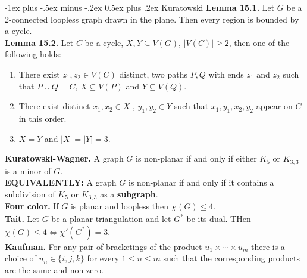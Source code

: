 \documentclass[10pt,landscape]{article}
\makeatletter
\renewcommand{\section}{\@startsection{section}{1}{0mm}%
                                {-1ex plus -.5ex minus -.2ex}%
                                {0.5ex plus .2ex}%
                                {\normalfont\large\bfseries}}
\makeatother
\begin{document}
\begin{multicols}{3}
\section{Kuratowski}
\textbf{Lemma 15.1.} Let \( G \) be a 2-connected loopless graph drawn in the plane. Then every region is bounded by a cycle. \\
\textbf{Lemma 15.2.} Let \( C \) be a cycle, \( X,Y \subseteq V(G) \), \( |V(C)| \geq 2 \), then one of the following holds:
\begin{enumerate}
	\item There exist \( z_1, z_2 \in V(C) \) distinct, two paths \( P,Q \) with ends \( z_1 \) and \( z_2 \) such that \( P \cup Q = C\), \( X \subseteq V(P) \) and \( Y \subseteq V(Q) \).
	\item There exist distinct \( x_1, x_2 \in X \) , \( y_1, y_2 \in Y \) such that \( x_1, y_1, x_2, y_2 \) appear on \( C \) in this order. 
	\item \( X = Y \) and \( |X|=|Y|=3 \).
	
	
	
\end{enumerate}
\textbf{Kuratowski-Wagner.} A graph \( G \) is non-planar if and only if either \( K_5 \) or \( K_{3,3}   \) is a minor of \( G \). \\
\textbf{EQUIVALENTLY:} A graph \( G \) is non-planar if and only if it contains a subdivision of \( K_5 \) or \( K_{3,3}  \) as a \textbf{subgraph}. \\
\textbf{Four color.} If \( G \) is planar and loopless then \( \chi_{} (G) \leq 4 \). \\
\textbf{Tait.} Let \( G \) be a planar triangulation and let \( G^{\ast}  \) be its dual. THen \( \chi_{} (G) \leq 4 \iff \chi_{} ' (G^{\ast} ) = 3 \). \\
\textbf{Kaufman.} For any pair of bracketings of the product \( u_1\times \cdots \times u_{m}  \) there is a choice of \( u_{n} \in \{ i,j,k \}  \) for every \( 1 \leq n \leq m \) such that the corresponding products are the same and non-zero.

\end{multicols}
\end{document}

